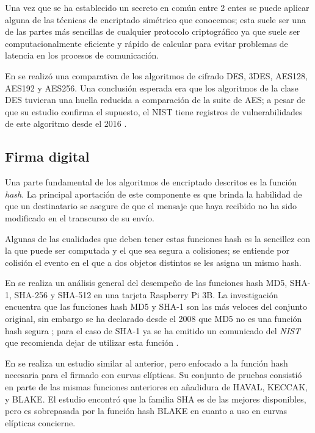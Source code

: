 \documentclass{article}
\begin{document}
            Una vez que se ha establecido un secreto en común entre 2 entes se puede aplicar alguna de las técnicas de encriptado simétrico que conocemos; esta suele ser una de las partes más sencillas de cualquier protocolo criptográfico ya que suele ser computacionalmente eficiente y rápido de calcular para evitar problemas de latencia en los procesos de comunicación.

            En \cite{el2018analysis} se realizó una comparativa de los algoritmos de cifrado DES, 3DES, AES128, AES192 y AES256. Una conclusión esperada era que los algoritmos de la clase DES tuvieran una huella reducida a comparación de la suite de AES; a pesar de que su estudio confirma el supuesto, el NIST tiene registros de vulnerabilidades de este algoritmo desde el 2016 \cite{des_vulnerable}.
        \subsection{Firma digital}

            Una parte fundamental de los algoritmos de encriptado descritos es la función \textit{hash}. La principal aportación de este componente es que brinda la habilidad de que un destinatario se asegure de que el mensaje que haya recibido no ha sido modificado en el transcurso de su envío.

            Algunas de las cualidades que deben tener estas funciones hash es la sencillez con la que puede ser computada y el que sea segura a colisiones; se entiende por colisión el evento en el que a dos objetos distintos se les asigna un mismo hash.

            En \cite{el2018analysis} se realiza un análisis general del desempeño de las funciones hash MD5, SHA-1, SHA-256 y SHA-512 en una tarjeta Raspberry Pi 3B. La investigación encuentra que las funciones hash MD5 y SHA-1 son las más veloces del conjunto original, sin embargo se ha declarado desde el 2008 que MD5 no es una función hash segura \cite{md5_vulnerable}; para el caso de SHA-1 ya se ha emitido un comunicado del \textit{NIST} que recomienda dejar de utilizar esta función \cite{sha1_vulnerable}.

            En \cite{rao2019comparative} se realiza un estudio similar al anterior, pero enfocado a la función hash necesaria para el firmado con curvas elípticas. Su conjunto de pruebas consistió en parte de las mismas funciones anteriores en añadidura de HAVAL, KECCAK, y BLAKE. El estudio encontró que la familia SHA es de las mejores disponibles, pero es sobrepasada por la función hash BLAKE en cuanto a uso en curvas elípticas concierne.
\end{document}
